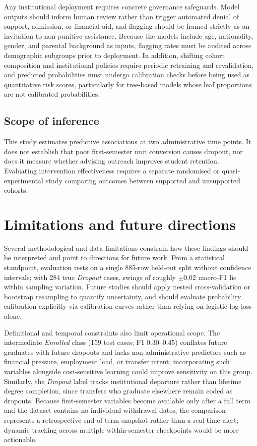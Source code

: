 \documentclass[11pt,a4paper]{article}
\newcommand{\Dropout}{\textit{Dropout}}
\newcommand{\Enrolled}{\textit{Enrolled}}
\begin{document}
Any institutional deployment requires concrete governance safeguards. Model outputs should inform
human review rather than trigger automated denial of support, admission, or financial aid, and
flagging should be framed strictly as an invitation to non-punitive assistance. Because the models
include age, nationality, gender, and parental background as inputs, flagging rates must be audited
across demographic subgroups prior to deployment. In addition, shifting cohort composition and
institutional policies require periodic retraining and revalidation, and predicted probabilities
must undergo calibration checks before being used as quantitative risk scores, particularly for
tree-based models whose leaf proportions are not calibrated probabilities.

\subsection{Scope of inference}

This study estimates predictive associations at two administrative time points. It does not
establish that poor first-semester unit conversion causes dropout, nor does it measure whether
advising outreach improves student retention. Evaluating intervention effectiveness requires a
separate randomised or quasi-experimental study comparing outcomes between supported and unsupported
cohorts.

\section{Limitations and future directions}

Several methodological and data limitations constrain how these findings should be interpreted and
point to directions for future work. From a statistical standpoint, evaluation rests on a single
885-row held-out split without confidence intervals; with 284 true \Dropout{} cases, swings of
roughly $\pm 0.02$ macro-F1 lie within sampling variation. Future studies should apply nested
cross-validation or bootstrap resampling to quantify uncertainty, and should evaluate probability
calibration explicitly via calibration curves rather than relying on logistic log-loss alone.

Definitional and temporal constraints also limit operational scope. The intermediate \Enrolled{}
class (159 test cases; F1 0.30--0.45) conflates future graduates with future dropouts and lacks
non-administrative predictors such as financial pressure, employment load, or transfer intent;
incorporating such variables alongside cost-sensitive learning could improve sensitivity on this
group. Similarly, the \Dropout{} label tracks institutional departure rather than lifetime degree
completion, since transfers who graduate elsewhere remain coded as dropouts. Because first-semester
variables become available only after a full term and the dataset contains no individual withdrawal
dates, the comparison represents a retrospective end-of-term snapshot rather than a real-time alert;
dynamic tracking across multiple within-semester checkpoints would be more actionable.
\end{document}

